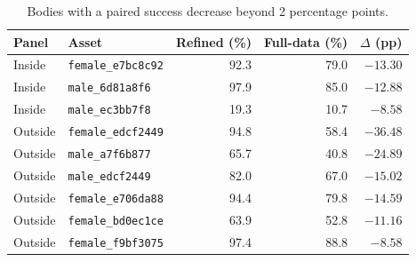 \begin{table}[t]
\centering\small
\caption{Bodies with a paired success decrease beyond 2 percentage points.}\label{tab:unseen_v2_regressions}
\begin{tabular}{llrrr}
\toprule
Panel & Asset & Refined (\%) & Full-data (\%) & $\Delta$ (pp) \\
\midrule
Inside & \texttt{female\_e7bc8c92} & 92.3 & 79.0 & $-13.30$ \\
Inside & \texttt{male\_6d81a8f6} & 97.9 & 85.0 & $-12.88$ \\
Inside & \texttt{male\_ec3bb7f8} & 19.3 & 10.7 & $-8.58$ \\
Outside & \texttt{female\_edcf2449} & 94.8 & 58.4 & $-36.48$ \\
Outside & \texttt{male\_a7f6b877} & 65.7 & 40.8 & $-24.89$ \\
Outside & \texttt{male\_edcf2449} & 82.0 & 67.0 & $-15.02$ \\
Outside & \texttt{female\_e706da88} & 94.4 & 79.8 & $-14.59$ \\
Outside & \texttt{female\_bd0ec1ce} & 63.9 & 52.8 & $-11.16$ \\
Outside & \texttt{female\_f9bf3075} & 97.4 & 88.8 & $-8.58$ \\
\bottomrule
\end{tabular}
\end{table}


